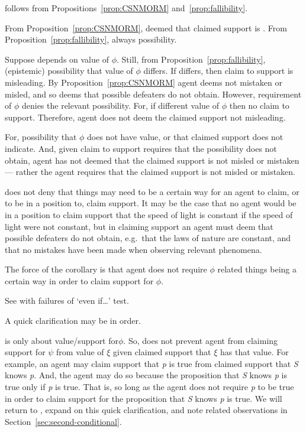 \begin{note}[\eiS{}]
  \eiS{} follows from Propositions~\ref{prop:CSNMORM} and~\ref{prop:fallibility}.

  From Proposition~\ref{prop:CSNMORM}, deemed that claimed support is \nmom{}.
  From Proposition~\ref{prop:fallibility}, always possibility.

  Suppose depends on value of \(\phi\).
  Still, from Proposition~\ref{prop:fallibility}, (epistemic) possibility that value of \(\phi\) differs.
  If differs, then claim to support is misleading.
  By Proposition~\ref{prop:CSNMORM} agent deems not mistaken or misled, and so deems that possible defeaters do not obtain.
  However, requirement of \(\phi\) denies the relevant possibility.
  For, if different value of \(\phi\) then no claim to support.
  Therefore, agent does not deem the claimed support not misleading.


  For, possibility that \(\phi\) does not have value, or that claimed support does not indicate.
  And, given claim to support requires that the possibility does not obtain, agent has not deemed that the claimed support is not misled or mistaken --- rather the agent requires that the claimed support is not misled or mistaken.

  \eiS{} does not deny that things may need to be a certain way for an agent to claim, or to be in a position to, claim support.
  It may be the case that no agent would be in a position to claim support that the speed of light is constant if the speed of light were not constant, but in claiming support an agent must deem that possible defeaters do not obtain, e.g.\ that the laws of nature are constant, and that no mistakes have been made when observing relevant phenomena.

  The force of the corollary is that agent does not require \(\phi\) related things being a certain way in order to claim support for \(\phi\).

  See with failures of `even if\dots' test.
\end{note}

\begin{note}
  A quick clarification may be in order.

  \eiS{} is only about value/support for\(\phi\).
  So, \eiS{} does not prevent agent from claiming support for \(\psi\) from value of \(\xi\) given claimed support that \(\xi\) has that value.
  For example, an agent may claim support that \emph{p} is true from claimed support that \emph{S} knows \emph{p}.
  And, the agent may do so because the proposition that \emph{S} knows \emph{p} is true only if \emph{p} is true.
  That is, so long as the agent does not require \emph{p} to be true in order to claim support for the proposition that \emph{S} knows \emph{p} is true.
  We will return to \eiS{}, expand on this quick clarification, and note related observations in Section~\ref{sec:second-conditional}.
\end{note}


